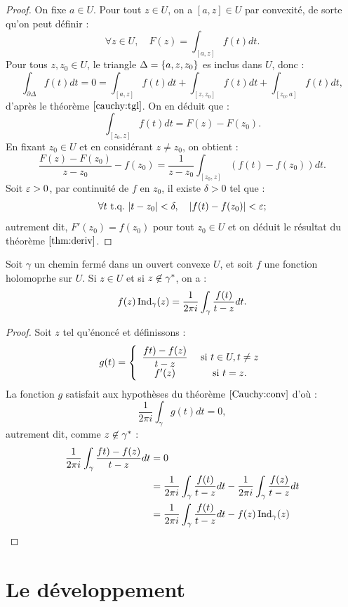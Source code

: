 \begin{proof}
On fixe $a \in U$. Pour tout $z\in U$, on a $[a,z] \in U$ par convexité, de sorte qu'on peut définir :
\[ \forall z \in U, \quad F(z) = \int_{[a,z]} f(t) dt . \]
Pour tous $z, z_0 \in U$, le triangle $\Delta = \{ a, z, z_0 \}$ es inclus dans $U$, donc :
\[ \int_{\partial \Delta} f(t) dt = 0 = \int_{[a,z]} f(t) dt + \int_{[z,z_0]} f(t) dt + \int_{[z_0,a]} f(t) dt , \]
d'après le théorème $\ref{cauchy:tgl}$. On en déduit que :
\[ \int_{[z_0, z]} f(t) dt = F(z) - F(z_0) . \]
En fixant $z_0 \in U$ et en considérant $z \neq z_0$, on obtient :
\[ \dfrac{F(z)-F(z_0)}{z-z_0} - f(z_0) = \dfrac1{z-z_0} \int_{[z_0, z]} (f(t) - f(z_0)) dt . \]
Soit $\varepsilon >0$, par continuité de $f$ en $z_0$, il existe $\delta >0$ tel que :
\[ \forall t \text{~t.q.~} \lvert t-z_0\rvert < \delta, \quad \lvert f(t)-f(z_0)\rvert < \varepsilon ; \]
autrement dit, $F'(z_0) = f(z_0)$ pour tout $z_0 \in U$ et on déduit le résultat du théorème $\ref{thm:deriv}$.
\end{proof}

\begin{thm}
\label{form:Cauchy}
Soit $\gamma$ un chemin fermé dans un ouvert convexe $U$, et soit $f$ une fonction holomoprhe sur $U$. 
Si $z \in U$ et si $z \not \in \gamma^{\ast}$, on a :
\[ f(z) \operatorname{Ind}_{\gamma}(z) = \dfrac1{2\pi i} \int_{\gamma} \dfrac{f(t)}{t-z} dt . \]
\end{thm}

\begin{proof}
Soit $z$ tel qu'énoncé et définissons :
\[ g(t) = \left \{ \begin{array}{c c}
\dfrac{ft)-f(z)}{t-z} & \text{  si  } t \in U, t \neq z \\
f'(z) & \text{  si  } t = z .
\end{array} \right . \]
La fonction $g$ satisfait aux hypothèses du théorème $\ref{Cauchy:conv}$ d'où :
\[ \dfrac1{2\pi i} \int_{\gamma} g(t) dt = 0 , \]
autrement dit, comme $z \not \in \gamma^{\ast}$ :
\begin{align*}
\dfrac1{2\pi i} \int_{\gamma} \dfrac{ft)-f(z)}{t-z} dt & = 0 \\
& = \dfrac1{2\pi i} \int_{\gamma} \dfrac{f(t)}{t-z} dt - \dfrac1{2\pi i} \int_{\gamma} \dfrac{f(z)}{t-z} dt \\
& = \dfrac1{2\pi i} \int_{\gamma} \dfrac{f(t)}{t-z} dt - f(z) \operatorname{Ind}_{\gamma}(z)
\end{align*}
\end{proof}

\section{Le développement}

